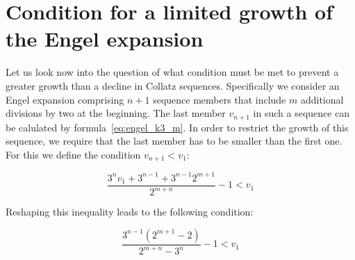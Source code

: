 \documentclass[12pt]{amsart}
\theoremstyle{definition}
\begin{document}
\section{Condition for a limited growth of the Engel expansion}
\label{sec:condition_limited_growth}
Let us look now into the question of what condition must be met to prevent a greater growth than a decline in Collatz sequences. Specifically we consider an Engel expansion comprising $n+1$ sequence members that include $m$ additional divisions by two at the beginning. The last member $v_{n+1}$ in such a sequence can be calulated by formula~\ref{eq:engel_k3_m}. In order to restrict the growth of this sequence, we require that the last member has to be smaller than the first one. For this we define the condition $v_{n+1}<v_1$:

\[
\frac{3^nv_1+3^{n-1}+3^{n-1}2^{m+1}}{2^{m+n}}-1<v_1
\]

\par\medskip\noindent
Reshaping this inequality leads to the following condition:

\begin{equation}
\label{eq:condition_limited_growth}
\frac{3^{n-1}\left(2^{m+1}-2\right)}{2^{m+n}-3^n}-1<v_1
\end{equation}

\vspace{1em}


\end{document}
